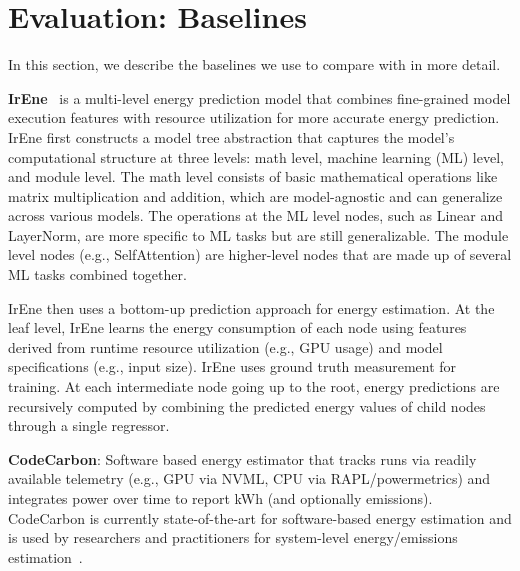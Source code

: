 \section{Evaluation: Baselines}
\label{app:baselines}

In this section, we describe the baselines we use to compare with \sys{} in more detail. 

\textbf{IrEne}~\citep{irene} is a multi-level energy prediction model that combines fine-grained model execution features with resource utilization for more accurate energy prediction.  
IrEne first constructs a model tree abstraction that captures the model's computational structure at three levels: math level, machine learning (ML) level, and module level. 
The math level consists of basic mathematical operations like matrix multiplication and addition, which are model-agnostic and can generalize across various models. 
The operations at the ML level nodes, such as Linear and LayerNorm, are more specific to ML tasks but are still generalizable. 
The module level nodes (e.g., SelfAttention) are higher-level nodes that are made up of several ML tasks combined together. 

 
IrEne then uses a bottom-up prediction approach for energy estimation. At the leaf level, IrEne learns the energy consumption of each node using features derived from runtime resource utilization (e.g., GPU usage) and model specifications (e.g., input size). IrEne uses ground truth measurement for training. At each intermediate node going up to the root, energy predictions are recursively computed by combining the predicted energy values of child nodes through a single regressor.

\textbf{CodeCarbon}: Software based energy estimator that tracks runs via readily available telemetry (e.g., GPU via NVML, CPU via RAPL/powermetrics) and integrates power over time to report kWh (and optionally emissions). CodeCarbon is currently state-of-the-art for software-based energy estimation and is used by researchers and practitioners for system-level energy/emissions estimation~\cite{Jesse-dodge-icml}.

